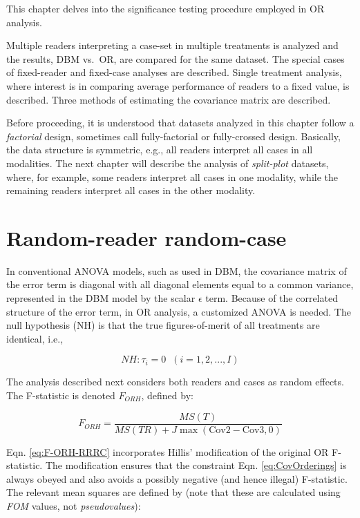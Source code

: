 \documentclass[
]{book}
\begin{document}
This chapter delves into the significance testing procedure employed in OR analysis.

Multiple readers interpreting a case-set in multiple treatments is analyzed and the results, DBM vs.~OR, are compared for the same dataset. The special cases of fixed-reader and fixed-case analyses are described. Single treatment analysis, where interest is in comparing average performance of readers to a fixed value, is described. Three methods of estimating the covariance matrix are described.

Before proceeding, it is understood that datasets analyzed in this chapter follow a \emph{factorial} design, sometimes call fully-factorial or fully-crossed design. Basically, the data structure is symmetric, e.g., all readers interpret all cases in all modalities. The next chapter will describe the analysis of \emph{split-plot} datasets, where, for example, some readers interpret all cases in one modality, while the remaining readers interpret all cases in the other modality.

\hypertarget{OR_RRRC}{%
\section{Random-reader random-case}\label{OR_RRRC}}

In conventional ANOVA models, such as used in DBM, the covariance matrix of the error term is diagonal with all diagonal elements equal to a common variance, represented in the DBM model by the scalar \(\epsilon\) term. Because of the correlated structure of the error term, in OR analysis, a customized ANOVA is needed. The null hypothesis (NH) is that the true figures-of-merit of all treatments are identical, i.e.,

\begin{equation}
NH:\tau_i=0\;\; (i=1,2,...,I)
\label{eq:ORModelNH}
\end{equation}

The analysis described next considers both readers and cases as random effects. The F-statistic is denoted \(F_{ORH}\), defined by:

\begin{equation}
F_{ORH}=\frac{MS(T)}{MS(TR)+J\max(\text{Cov2}-\text{Cov3},0)}
\label{eq:F-ORH-RRRC}
\end{equation}

Eqn. \eqref{eq:F-ORH-RRRC} incorporates Hillis' modification of the original OR F-statistic. The modification ensures that the constraint Eqn. \eqref{eq:CovOrderings} is always obeyed and also avoids a possibly negative (and hence illegal) F-statistic. The relevant mean squares are defined by (note that these are calculated using \emph{FOM} values, not \emph{pseudovalues}):
\end{document}

